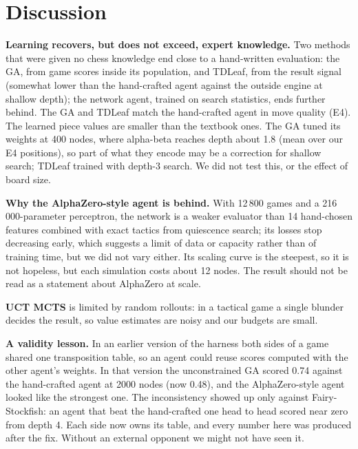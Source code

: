 \section{Discussion}
\textbf{Learning recovers, but does not exceed, expert knowledge.} Two methods that were given no chess knowledge end close to a hand-written evaluation: the GA, from game scores inside its population, and TDLeaf, from the result signal (somewhat lower than the hand-crafted agent against the outside engine at shallow depth); the network agent, trained on search statistics, ends further behind. The GA and TDLeaf match the hand-crafted agent in move quality (E4). The learned piece values are smaller than the textbook ones. The GA tuned its weights at 400 nodes, where alpha-beta reaches depth about 1.8 (mean over our E4 positions), so part of what they encode may be a correction for shallow search; TDLeaf trained with depth-3 search. We did not test this, or the effect of board size.

\textbf{Why the AlphaZero-style agent is behind.} With 12\,800 games and a 216\,000-parameter perceptron, the network is a weaker evaluator than 14 hand-chosen features combined with exact tactics from quiescence search; its losses stop decreasing early, which suggests a limit of data or capacity rather than of training time, but we did not vary either. Its scaling curve is the steepest, so it is not hopeless, but each simulation costs about 12 nodes. The result should not be read as a statement about AlphaZero at scale.

\textbf{UCT MCTS} is limited by random rollouts: in a tactical game a single blunder decides the result, so value estimates are noisy and our budgets are small.

\textbf{A validity lesson.} In an earlier version of the harness both sides of a game shared one transposition table, so an agent could reuse scores computed with the other agent's weights. In that version the unconstrained GA scored 0.74 against the hand-crafted agent at 2000 nodes (now 0.48), and the AlphaZero-style agent looked like the strongest one. The inconsistency showed up only against Fairy-Stockfish: an agent that beat the hand-crafted one head to head scored near zero from depth 4. Each side now owns its table, and every number here was produced after the fix. Without an external opponent we might not have seen it.

